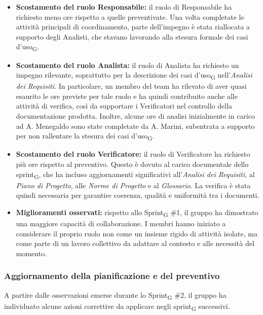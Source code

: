 \documentclass[a4paper, 10pt, colorlinks=true, linkcolor=black, urlcolor=blue, citecolor=blue, hidelinks]{article}
\begin{document}
\begin{itemize}
    \item \textbf{Scostamento del ruolo Responsabile:}
    il ruolo di Responsabile ha richiesto meno ore rispetto a quelle preventivate. Una volta completate le attività principali di coordinamento, parte dell'impegno è stata riallocata a supporto degli Analisti, che stavano lavorando alla stesura formale dei casi d'uso\textsubscript{G}.

    \item \textbf{Scostamento del ruolo Analista:}
    il ruolo di Analista ha richiesto un impegno rilevante, soprattutto per la descrizione dei casi d'uso\textsubscript{G} nell'\textit{Analisi dei Requisiti}. In particolare, un membro del team ha rilevato di aver quasi esaurito le ore previste per tale ruolo e ha quindi contribuito anche alle attività di verifica, così da supportare i Verificatori nel controllo della documentazione prodotta. Inoltre, alcune ore di analisi inizialmente in carico ad A. Menegaldo sono state completate da A. Marini, subentrata a supporto per non rallentare la stesura dei casi d'uso\textsubscript{G}.

    \item \textbf{Scostamento del ruolo Verificatore:}
    il ruolo di Verificatore ha richiesto più ore rispetto al preventivo. Questo è dovuto al carico documentale dello sprint\textsubscript{G}, che ha incluso aggiornamenti significativi all'\textit{Analisi dei Requisiti}, al \textit{Piano di Progetto}, alle \textit{Norme di Progetto} e al \textit{Glossario}. La verifica è stata quindi necessaria per garantire coerenza, qualità e uniformità tra i documenti.

    \item \textbf{Miglioramenti osservati:}
    rispetto allo Sprint\textsubscript{G} \#1, il gruppo ha dimostrato una maggiore capacità di collaborazione. I membri hanno iniziato a considerare il proprio ruolo non come un insieme rigido di attività isolate, ma come parte di un lavoro collettivo da adattare al contesto e alle necessità del momento.
\end{itemize}

\subsubsection{Aggiornamento della pianificazione e del preventivo}
A partire dalle osservazioni emerse durante lo Sprint\textsubscript{G} \#2, il gruppo ha individuato alcune azioni correttive da applicare negli sprint\textsubscript{G} successivi.
\end{document}
